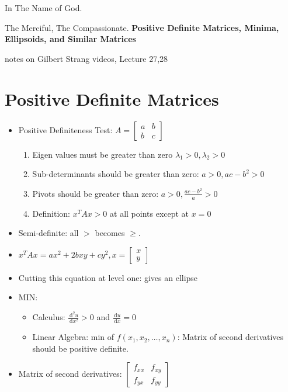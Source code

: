 \documentclass[a4paper,12pt]{article}
\newcommand{\ud}{\,\mathrm{d}}
\theoremstyle{definition} \newtheorem{Theorem}{Theorem}
\begin{document}
\begin{center}
In The Name of God.

The Merciful, The Compassionate.
\vskip 1cm
{\Large\bfseries{Positive Definite Matrices, Minima, Ellipsoids, and Similar Matrices }}

\vskip 0.2cm
\tiny{notes on Gilbert Strang videos, Lecture 27,28}
\end{center}

\section{Positive Definite Matrices}
\begin{itemize}
\item Positive Definiteness Test: $ A = \begin{bmatrix}
						a & b \\
						b & c
					 \end{bmatrix}$
\begin{enumerate}
\item Eigen values must be greater than zero $\lambda_1 > 0, \lambda_2 > 0$
\item Sub-determinants should be greater than zero: $a > 0, ac - b^2 > 0$
\item Pivots should be greater than zero: $a>0, \frac{ac-b^2}{a} > 0 $
\item Definition: $x^T A x > 0$ at all points except at $x=0$
\end{enumerate}
\item Semi-definite: all $>$ becomes $\geq$.
\item $x^T A x = ax^2 + 2bxy + cy^2, x = \begin{bmatrix}x \\ y\end{bmatrix}$
\item Cutting this equation at level one: gives an ellipse
\item MIN: 
\begin{itemize}
\item  Calculus: $\frac{\ud^2 u}{\ud x^2} > 0$ and $\frac{\ud u}{\ud x} = 0$
\item Linear Algebra: min of $f(x_1, x_2,\ldots,x_n)$: Matrix of second derivatives 
should be positive definite.
\end{itemize}
\item Matrix of second derivatives: $\begin{bmatrix} f_{xx} & f_{xy} \\ f_{yx} & f_{yy}\end{bmatrix}$

\end{itemize}
\end{document}
